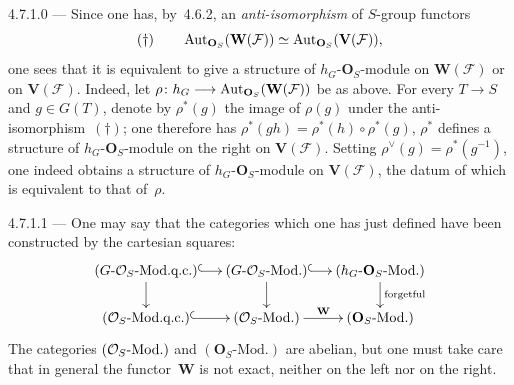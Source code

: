 \begin{remark}{4.7.1.0}\label{I.4.7.1.0}
--- {\renewcommand{\thefootnote}{(37)}}
Since one has, by~4.6.2, an \emph{anti-isomorphism} of \(S\)-group functors
\[
(\dagger) \qquad \operatorname{Aut}_{\mathbf{O}_S}(\mathbf{W}(\mathcal{F})) \simeq \operatorname{Aut}_{\mathbf{O}_S}(\mathbf{V}(\mathcal{F})),
\]
one sees that it is equivalent to give a structure of \(h_G\)-\(\mathbf{O}_S\)-module on \(\mathbf{W}(\mathcal{F})\) or on \(\mathbf{V}(\mathcal{F})\). Indeed, let \(\rho \colon h_G \longrightarrow \operatorname{Aut}_{\mathbf{O}_S}(\mathbf{W}(\mathcal{F}))\) be as above. For every \(T \to S\) and \(g \in G(T)\), denote by \(\rho^*(g)\) the image of \(\rho(g)\) under the anti-isomorphism~\((\dagger)\); one therefore has \(\rho^*(gh) = \rho^*(h) \circ \rho^*(g)\), \ie \(\rho^*\) defines a structure of \(h_G\)-\(\mathbf{O}_S\)-module \og on the right\fg{} on \(\mathbf{V}(\mathcal{F})\). Setting \(\rho^{\vee}(g) = \rho^*(g^{-1})\), one indeed obtains a structure of \(h_G\)-\(\mathbf{O}_S\)-module on \(\mathbf{V}(\mathcal{F})\), the datum of which is equivalent to that of~\(\rho\).
\end{remark}

\begin{remark}{4.7.1.1}\label{I.4.7.1.1}
--- One may say that the categories which one has just defined have been constructed by the cartesian squares:
\[
\xymatrix@C=1.4em@R=1.8em{
(G\text{-}\OS\text{-Mod.q.c.}) \ar@{^{(}->}[r] \ar[d]
  & (G\text{-}\OS\text{-Mod.}) \ar@{^{(}->}[r] \ar[d]
  & (h_G\text{-}\mathbf{O}_S\text{-Mod.}) \ar[d]^{\textup{forgetful}} \\
(\OS\text{-Mod.q.c.}) \ar@{^{(}->}[r]
  & (\OS\text{-Mod.}) \ar[r]^{\mathbf{W}}
  & (\mathbf{O}_S\text{-Mod.})
}
\]
{\renewcommand{\thefootnote}{(38)}}
The categories \((\mathcal{O}_S\text{-Mod.})\) and \((\mathbf{O}_S\text{-Mod.})\) are abelian, but one must take care that in general the functor~\(\mathbf{W}\) is not exact, neither on the left nor on the right.
\end{remark}
